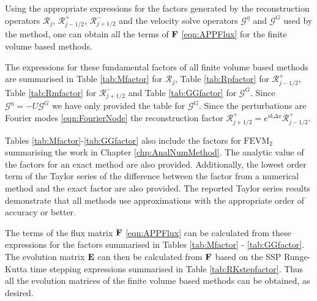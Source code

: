Using the appropriate expressions for the factors generated by the reconstruction operators $\mathcal{R}_j$, $\mathcal{R}^+_{j-1/2}$, $\mathcal{R}^-_{j+1/2}$ and the velocity solve operators $\mathcal{G}^\eta$ and $\mathcal{G}^G$ used by the method, one can obtain all the terms of $\mathbf{F}$ \eqref{eqn:APPFlux} for the finite volume based methods.

The expressions for these fundamental factors of all finite volume based methods are summarised in Table \ref{tab:Mfactor} for $\mathcal{R}_j$, Table \ref{tab:Rpfactor} for $\mathcal{R}^+_{j-1/2}$, Table \ref{tab:Rmfactor} for $\mathcal{R}^-_{j+1/2}$ and Table \ref{tab:GGfactor} for $\mathcal{G}^G$. Since $\mathcal{G}^\eta = -U\mathcal{G}^G $ we have only provided the table for $\mathcal{G}^G$. Since the perturbations are Fourier modes \eqref{eqn:FourierNode} the reconstruction factor $\mathcal{R}^+_{j+1/2}= e^{ i k\Delta x}\mathcal{R}^+_{j-1/2}$. 

Tables \ref{tab:Mfactor}-\ref{tab:GGfactor} also include the factors for $\text{FEVM}_2$ summarising the work in Chapter \ref{chp:AnalNumMethod}. The analytic value of the factors for an exact method are also provided. Additionally, the lowest order term of the Taylor series of the difference between the factor from a numerical method and the exact factor are also provided. The reported Taylor series results demonstrate that all methods use approximations with the appropriate order of accuracy or better.

The terms of the flux matrix $\mathbf{F}$ \eqref{eqn:APPFlux} can be calculated from these expressions for the factors summarised in Tables \ref{tab:Mfactor} - \ref{tab:GGfactor}. The evolution matrix $\mathbf{E}$ can then be calculated from $\mathbf{F}$ based on the SSP Runge-Kutta time stepping expressions summarised in Table \ref{tab:RKstepfactor}. Thus all the evolution matrices of the finite volume based methods can be obtained, as desired.
 


